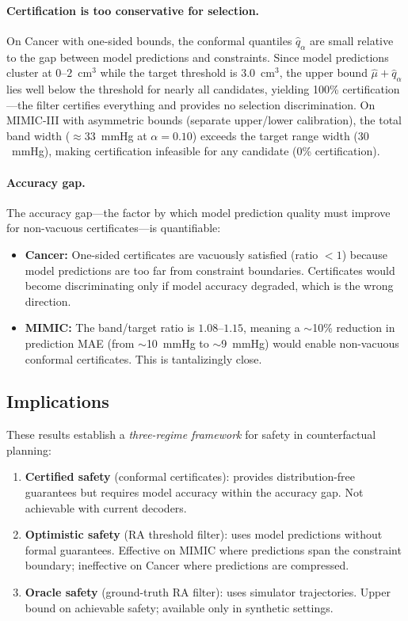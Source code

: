 \documentclass{article}
\begin{document}
\paragraph{Certification is too conservative for selection.} On Cancer with one-sided bounds, the conformal quantiles $\hat{q}_\alpha$ are small relative to the gap between model predictions and constraints. Since model predictions cluster at $0$--$2$~cm$^3$ while the target threshold is $3.0$~cm$^3$, the upper bound $\hat{\mu} + \hat{q}_\alpha$ lies well below the threshold for nearly all candidates, yielding 100\% certification---the filter certifies everything and provides no selection discrimination. On MIMIC-III with asymmetric bounds (separate upper/lower calibration), the total band width ($\approx 33$~mmHg at $\alpha = 0.10$) exceeds the target range width ($30$~mmHg), making certification infeasible for any candidate (0\% certification).

\paragraph{Accuracy gap.} The accuracy gap---the factor by which model prediction quality must improve for non-vacuous certificates---is quantifiable:
\begin{itemize}
\item \textbf{Cancer:} One-sided certificates are vacuously satisfied (ratio $< 1$) because model predictions are too far from constraint boundaries. Certificates would become discriminating only if model accuracy degraded, which is the wrong direction.
\item \textbf{MIMIC:} The band/target ratio is $1.08$--$1.15$, meaning a $\sim$10\% reduction in prediction MAE (from $\sim$10~mmHg to $\sim$9~mmHg) would enable non-vacuous conformal certificates. This is tantalizingly close.
\end{itemize}

\subsection{Implications}

These results establish a \emph{three-regime framework} for safety in counterfactual planning:
\begin{enumerate}
\item \textbf{Certified safety} (conformal certificates): provides distribution-free guarantees but requires model accuracy within the accuracy gap. Not achievable with current decoders.
\item \textbf{Optimistic safety} (RA threshold filter): uses model predictions without formal guarantees. Effective on MIMIC where predictions span the constraint boundary; ineffective on Cancer where predictions are compressed.
\item \textbf{Oracle safety} (ground-truth RA filter): uses simulator trajectories. Upper bound on achievable safety; available only in synthetic settings.
\end{enumerate}
\end{document}
